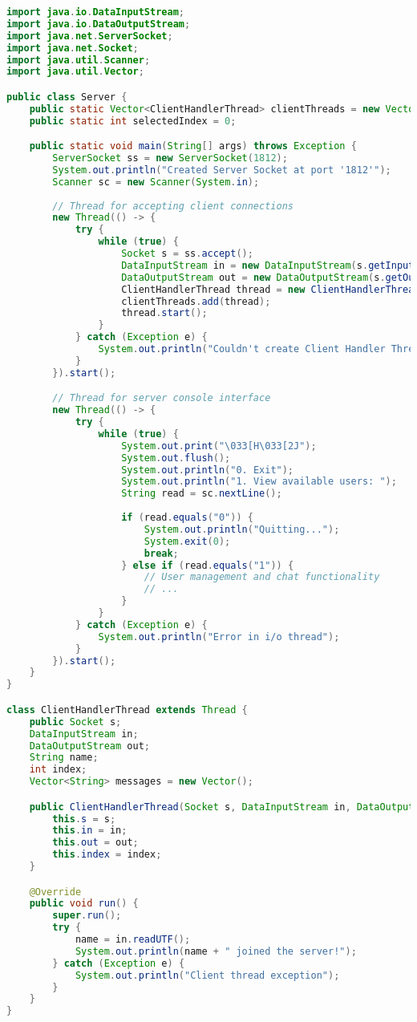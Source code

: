 \documentclass[12pt,a4paper]{article}
\begin{document}
\begin{lstlisting}[language=Java, caption=Server.java - Main Server Class]
import java.io.DataInputStream;
import java.io.DataOutputStream;
import java.net.ServerSocket;
import java.net.Socket;
import java.util.Scanner;
import java.util.Vector;

public class Server {
    public static Vector<ClientHandlerThread> clientThreads = new Vector<>();
    public static int selectedIndex = 0;

    public static void main(String[] args) throws Exception {
        ServerSocket ss = new ServerSocket(1812);
        System.out.println("Created Server Socket at port '1812'");
        Scanner sc = new Scanner(System.in);
        
        // Thread for accepting client connections
        new Thread(() -> {
            try {
                while (true) {
                    Socket s = ss.accept();
                    DataInputStream in = new DataInputStream(s.getInputStream());
                    DataOutputStream out = new DataOutputStream(s.getOutputStream());
                    ClientHandlerThread thread = new ClientHandlerThread(s, in, out, clientThreads.size());
                    clientThreads.add(thread);
                    thread.start();
                }
            } catch (Exception e) {
                System.out.println("Couldn't create Client Handler Thread");
            }
        }).start();

        // Thread for server console interface
        new Thread(() -> {
            try {
                while (true) {
                    System.out.print("\033[H\033[2J");
                    System.out.flush();
                    System.out.println("0. Exit");
                    System.out.println("1. View available users: ");
                    String read = sc.nextLine();
                    
                    if (read.equals("0")) {
                        System.out.println("Quitting...");
                        System.exit(0);
                        break;
                    } else if (read.equals("1")) {
                        // User management and chat functionality
                        // ...
                    }
                }
            } catch (Exception e) {
                System.out.println("Error in i/o thread");
            }
        }).start();
    }
}

class ClientHandlerThread extends Thread {
    public Socket s;
    DataInputStream in;
    DataOutputStream out;
    String name;
    int index;
    Vector<String> messages = new Vector();

    public ClientHandlerThread(Socket s, DataInputStream in, DataOutputStream out, int index) {
        this.s = s;
        this.in = in;
        this.out = out;
        this.index = index;
    }

    @Override
    public void run() {
        super.run();
        try {
            name = in.readUTF();
            System.out.println(name + " joined the server!");
        } catch (Exception e) {
            System.out.println("Client thread exception");
        }
    }
}
\end{lstlisting}
\end{document}
